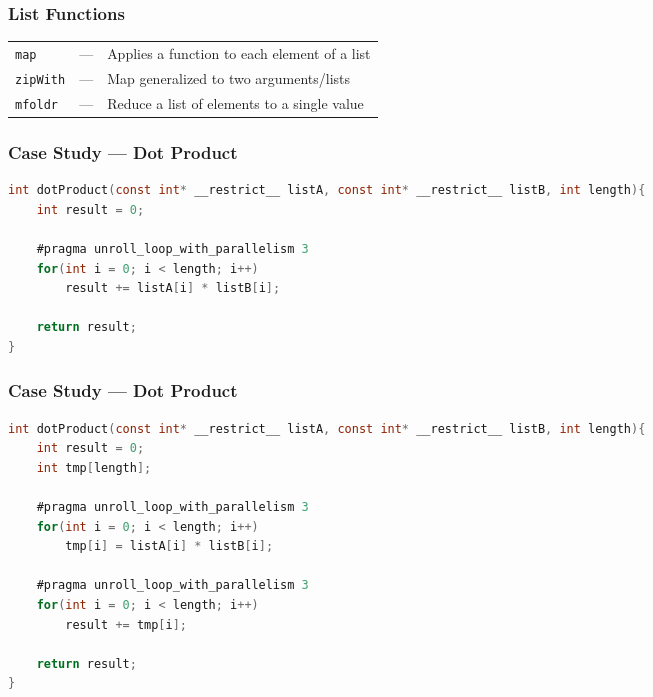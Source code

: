 \documentclass{beamer}
\begin{document}
\begin{frame}[t]
\end{frame}


\begin{frame}
    \frametitle{List Functions}
    \begin{tabularx}{\textwidth}{l l l}
        \texttt{map}     & --- & Applies a function to each element of a list  \\
        \texttt{zipWith} & --- & Map generalized to two arguments/lists      \\
        \texttt{mfoldr}  & --- & Reduce a list of elements to a single value \\
    \end{tabularx}
\end{frame}


\begin{frame}[fragile]
    \frametitle{Case Study --- Dot Product}

\begin{lstlisting}[language=C]
int dotProduct(const int* __restrict__ listA, const int* __restrict__ listB, int length){
    int result = 0;

    #pragma unroll_loop_with_parallelism 3
    for(int i = 0; i < length; i++)
        result += listA[i] * listB[i];

    return result;
}
\end{lstlisting}
\end{frame}

\begin{frame}[fragile]
    \frametitle{Case Study --- Dot Product}

\begin{lstlisting}[language=C]
int dotProduct(const int* __restrict__ listA, const int* __restrict__ listB, int length){
    int result = 0;
    int tmp[length];

    #pragma unroll_loop_with_parallelism 3
    for(int i = 0; i < length; i++)
        tmp[i] = listA[i] * listB[i];

    #pragma unroll_loop_with_parallelism 3
    for(int i = 0; i < length; i++)
        result += tmp[i];

    return result;
}
\end{lstlisting}
\end{frame}
\end{document}
